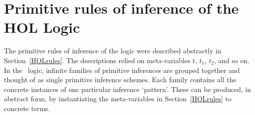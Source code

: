 %
%
%
%
%
%
%
%
%
%
%
%
%
%
%
%


\section{Primitive rules of inference of the HOL Logic}
\label{rules}

The primitive rules of inference of the logic were described abstractly
in Section~\ref{HOLrules}. The descriptions relied on meta-variables
$t$, $t_1$, $t_2$, and so on.
In the \HOL\ logic, infinite families of primitive
inferences are grouped together and thought of as single primitive inference
schemes.  Each family contains all the concrete instances of one
particular inference `pattern'. These can be produced, in
abstract form, by instantiating the meta-variables in Section~\ref{HOLrules}
to concrete terms.

